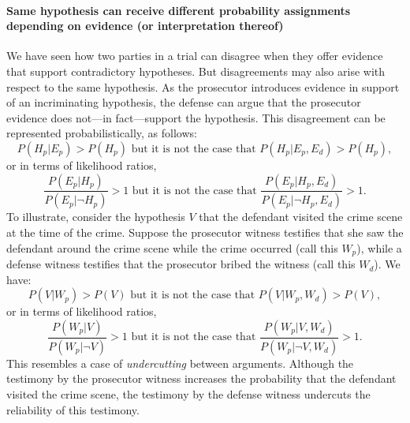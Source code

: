 \documentclass[10pt]{article}
\begin{document}
 \paragraph{Same hypothesis can receive different probability assignments depending on evidence (or interpretation thereof)}

We have seen how two parties in a trial can disagree when they offer evidence that support contradictory 
hypotheses. But disagreements may also arise with respect to the same hypothesis. 
As the prosecutor introduces evidence in support of an incriminating hypothesis, 
the defense can argue that the prosecutor evidence does not---in fact---support 
the hypothesis. This disagreement can be represented probabilistically, as follows:
%
\[P(H_p| E_p)>P(H_p) \text{ but it is not the case that }  P(H_p | E_p, E_d) > P(H_p),\]
%
or in terms of likelihood ratios, 
%
\[\frac{P(E_p| H_p)}{P(E_p|\neg H_p)}>1 \text{ but it is not the case that } \frac{P(E_p|H_p, E_d)}{P(E_p|\neg H_p, E_d)} >1.\] 
%
To illustrate, consider the hypothesis $V$ that the defendant visited the crime scene at the time of the crime. 
Suppose the prosecutor witness testifies that she saw the defendant around the crime scene while the crime occurred (call this $W_p$), 
while a defense witness testifies that the prosecutor bribed the witness (call this $W_d$). We have:
%
\[P(V| W_p)>P(V) \text{ but it is not the case that } P(V | W_p, W_d) > P(V),\]
%
or in terms of likelihood ratios, 
%
\[\frac{P(W_p| V)}{P(W_p|\neg V)}>1 \text{ but it is not the case that } \frac{P(W_p | V, W_d)}{P(W_p|\neg V, W_d)} >1.\] 
%
This resembles a case of \textit{undercutting} between arguments. 
Although the testimony by the prosecutor witness increases the probability that the defendant visited the crime scene, 
the testimony by the defense witness undercuts the reliability of this testimony. 
\end{document}
